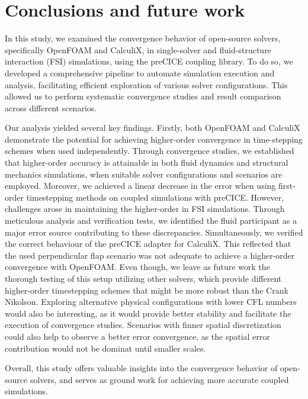 \documentclass[
  english,        %
  font=times,     %
  onecolumn,      %
]{tumarticle}
\begin{document}



\section{Conclusions and future work}

In this study, we examined the convergence behavior of open-source solvers, specifically OpenFOAM and CalculiX, in single-solver and fluid-structure interaction (FSI) simulations, using the preCICE coupling library. To do so, we developed a comprehensive pipeline to automate simulation execution and analysis, facilitating efficient exploration of various solver configurations. This allowed us to perform systematic convergence studies and result comparison across different scenarios. 

Our analysis yielded several key findings. Firstly, both OpenFOAM and CalculiX demonstrate the potential for achieving higher-order convergence in time-stepping schemes when used independently. Through convergence studies, we established that higher-order accuracy is attainable in both fluid dynamics and structural mechanics simulations, when suitable solver configurations and scenarios are employed.
Moreover, we achieved a linear decrease in the error when using first-order timestepping methods on coupled simulations with preCICE. However, challenges arose in maintaining the higher-order in FSI simulations. Through meticulous analysis and verification tests, we identified the fluid participant as a major error source contributing to these discrepancies. Simultaneously, we verified the correct behaviour of the preCICE adapter for CalculiX. This reflected that the used perpendicular flap scenario was not adequate to achieve a higher-order convergence with OpenFOAM. Even though, we leave as future work the thorough testing of this setup utilizing other solvers, which provide different higher-order timestepping schemes that might be more robust than the Crank Nikolson. Exploring alternative physical configurations with lower CFL numbers would also be interesting, as it would provide better stability and facilitate the execution of convergence studies. Scenarios with finner spatial discretization could also help to observe a better error convergence, as the spatial error contribution would not be dominat until smaller scales. 

Overall, this study offers valuable insights into the convergence behavior of open-source solvers, and serves as ground work for achieving more accurate coupled simulations.


\pagebreak

\printbibliography
\end{document}
